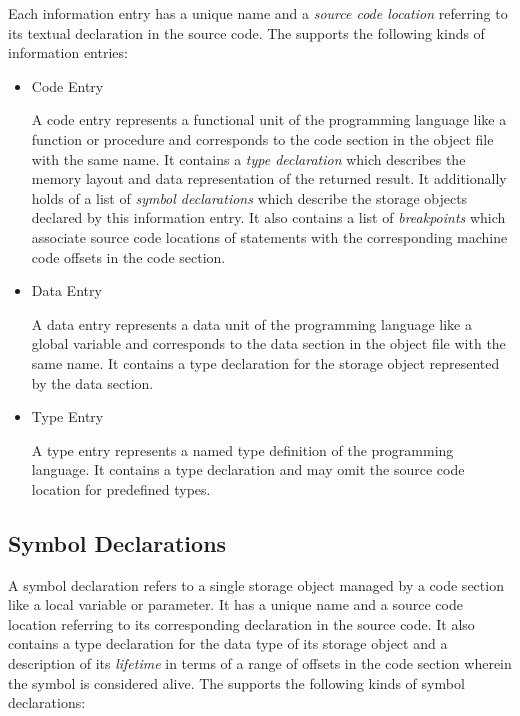 Each information entry has a unique name and a \emph{source code location} referring to its textual declaration in the source code.
The \ecs{} supports the following kinds of information entries:

\begin{itemize}

\item Code Entry\alignright{}\nopagebreak

A code entry represents a functional unit of the programming language like a function or procedure and corresponds to the code section in the object file with the same name.
It contains a \emph{type declaration} which describes the memory layout and data representation of the returned result.
It additionally holds of a list of \emph{symbol declarations} which describe the storage objects declared by this information entry.
It also contains a list of \emph{breakpoints} which associate source code locations of statements with the corresponding machine code offsets in the code section.

\item Data Entry\alignright{}\nopagebreak

A data entry represents a data unit of the programming language like a global variable and corresponds to the data section in the object file with the same name.
It contains a type declaration for the storage object represented by the data section.

\item Type Entry\alignright{}\nopagebreak

A type entry represents a named type definition of the programming language.
It contains a type declaration and may omit the source code location for predefined types.

\end{itemize}

\subsection{Symbol Declarations}\label{sec:dbgsymboldeclarations}

A symbol declaration refers to a single storage object managed by a code section like a local variable or parameter.
It has a unique name and a source code location referring to its corresponding declaration in the source code.
It also contains a type declaration for the data type of its storage object and a description of its \emph{lifetime} in terms of a range of offsets in the code section wherein the symbol is considered alive.
The \ecs{} supports the following kinds of symbol declarations:

